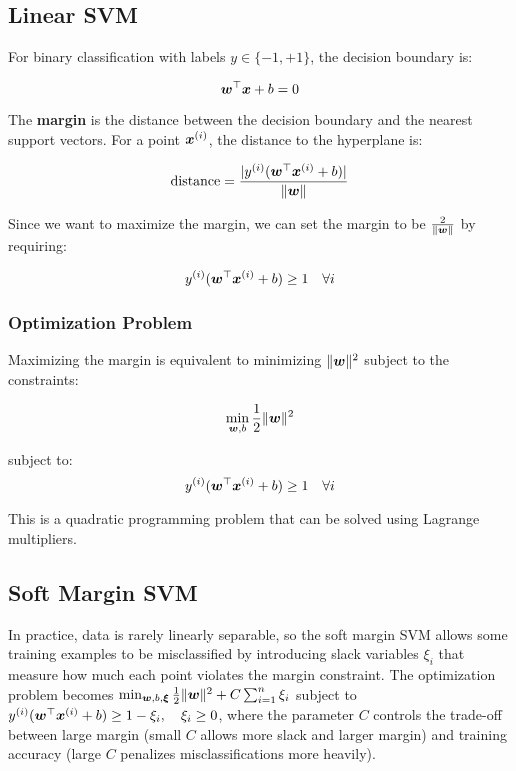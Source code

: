 \subsection{Linear SVM}

For binary classification with labels $y \in \{-1, +1\}$, the decision boundary is:

\begin{equation}
\boldsymbol{w}^\top \boldsymbol{x} + b = 0
\end{equation}

The \textbf{margin} is the distance between the decision boundary and the nearest support vectors. For a point $\boldsymbol{x}^{(i)}$, the distance to the hyperplane is:

\begin{equation}
\text{distance} = \frac{|y^{(i)}(\boldsymbol{w}^\top \boldsymbol{x}^{(i)} + b)|}{\|\boldsymbol{w}\|}
\end{equation}

Since we want to maximize the margin, we can set the margin to be $\frac{2}{\|\boldsymbol{w}\|}$ by requiring:

\begin{equation}
y^{(i)}(\boldsymbol{w}^\top \boldsymbol{x}^{(i)} + b) \geq 1 \quad \forall i
\end{equation}

\subsubsection{Optimization Problem}

Maximizing the margin is equivalent to minimizing $\|\boldsymbol{w}\|^2$ subject to the constraints:

\begin{equation}
\min_{\boldsymbol{w}, b} \frac{1}{2}\|\boldsymbol{w}\|^2
\end{equation}

subject to:
\begin{equation}
y^{(i)}(\boldsymbol{w}^\top \boldsymbol{x}^{(i)} + b) \geq 1 \quad \forall i
\end{equation}

This is a quadratic programming problem that can be solved using Lagrange multipliers.

\subsection{Soft Margin SVM}

In practice, data is rarely linearly separable, so the soft margin SVM allows some training examples to be misclassified by introducing slack variables $\xi_i$ that measure how much each point violates the margin constraint. The optimization problem becomes $\min_{\boldsymbol{w}, b, \boldsymbol{\xi}} \frac{1}{2}\|\boldsymbol{w}\|^2 + C \sum_{i=1}^{n} \xi_i$ subject to $y^{(i)}(\boldsymbol{w}^\top \boldsymbol{x}^{(i)} + b) \geq 1 - \xi_i, \quad \xi_i \geq 0$, where the parameter $C$ controls the trade-off between large margin (small $C$ allows more slack and larger margin) and training accuracy (large $C$ penalizes misclassifications more heavily).

